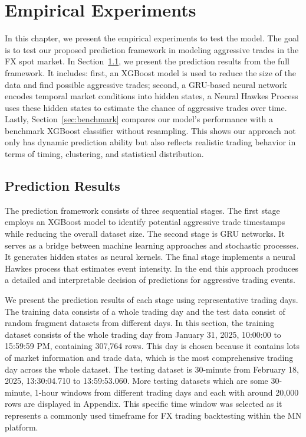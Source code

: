 \chapter{Empirical Experiments}\label{chapter:experiments}
In this chapter, we present the empirical experiments to test the model. The goal is to test our proposed prediction framework in modeling aggressive trades in the FX spot market. In Section~\ref{sec:prediction}, we present the prediction results from the full framework. It includes: first, an XGBoost model is used to reduce the size of the data and find possible aggressive trades; second, a GRU-based neural network encodes temporal market conditions into hidden states, a Neural Hawkes Process uses these hidden states to estimate the chance of aggressive trades over time. Lastly, Section~\ref{sec:benchmark} compares our model's performance with a benchmark XGBoost classifier without resampling. This shows our approach not only has dynamic prediction ability but also reflects realistic trading behavior in terms of timing, clustering, and statistical distribution.


\section{Prediction Results} \label{sec:prediction}
The prediction framework consists of three sequential stages. The first stage employs an XGBoost model to identify potential aggressive trade timestamps while reducing the overall dataset size. The second stage is GRU networks. It serves as a bridge between machine learning approaches and stochastic processes. It generates hidden states as neural kernels. The final stage implements a neural Hawkes process that estimates event intensity. In the end this approach produces a detailed and interpretable decision of predictions for aggressive trading events.

We present the prediction results of each stage using representative trading days. The training data consists of a whole trading day and the test data consist of random fragment datasets from different days. In this section, the training dataset consists of the whole trading day from January 31, 2025, 10:00:00 to 15:59:59 PM, containing 307,764 rows. This day is chosen because it contains lots of market information and trade data, which is the most comprehensive trading day across the whole dataset. The testing dataset is 30-minute from February 18, 2025, 13:30:04.710 to 13:59:53.060. More testing datasets which are some 30-minute, 1-hour windows from different trading days and each with around 20,000 rows are displayed in Appendix. This specific time window was selected as it represents a commonly used timeframe for FX trading backtesting within the MN platform.

